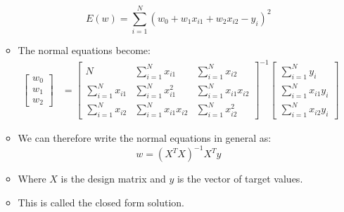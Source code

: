 \documentclass[12pt]{article}
\begin{document}
\begin{itemize}
\begin{itemize}
                        \begin{equation}
                            E(w) = \sum_{i=1}^N {(w_0 + w_1x_{i1} + w_2x_{i2} - y_i)}^2
                        \end{equation}
                        \item The normal equations become:
                        \begin{align*}
                            \begin{bmatrix}
                                w_0\\
                                w_1\\
                                w_2
                            \end{bmatrix} &= \begin{bmatrix}
                                N & \sum_{i=1}^N x_{i1} & \sum_{i=1}^N x_{i2}\\
                                \sum_{i=1}^N x_{i1} & \sum_{i=1}^N x_{i1}^2 & \sum_{i=1}^N x_{i1}x_{i2}\\
                                \sum_{i=1}^N x_{i2} & \sum_{i=1}^N x_{i1}x_{i2} & \sum_{i=1}^N x_{i2}^2
                            \end{bmatrix}^{-1} \begin{bmatrix}
                                \sum_{i=1}^N y_i\\
                                \sum_{i=1}^N {x_{i1}}y_i\\
                                \sum_{i=1}^N {x_{i2}}y_i
                            \end{bmatrix}
                        \end{align*}
                        \item We can therefore write the normal equations in general as:
                        \begin{equation}
                            w = {({X^T}X)}^{-1}{X^T}y
                        \end{equation}
                        \item Where $X$ is the design matrix and $y$ is the vector of target values.
                        \item This is called the closed form solution.
                    \end{itemize}

\end{itemize}
\end{document}
